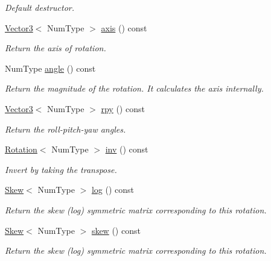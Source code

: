 \begin{DoxyCompactItemize}
\begin{DoxyCompactList}\small\item\em Default destructor. \end{DoxyCompactList}\item 
\hyperlink{singletonscrews_1_1_translation}{Vector3}$<$ Num\+Type $>$ \hyperlink{singletonscrews_1_1_rotation_a7ce8dc80a0e21118bc1c4361677f4a9f}{axis} () const 
\begin{DoxyCompactList}\small\item\em Return the axis of rotation. \end{DoxyCompactList}\item 
Num\+Type \hyperlink{singletonscrews_1_1_rotation_ab13ac401aaf6ff74c9b746e244e88c88}{angle} () const 
\begin{DoxyCompactList}\small\item\em Return the magnitude of the rotation. It calculates the axis internally. \end{DoxyCompactList}\item 
\hyperlink{singletonscrews_1_1_translation}{Vector3}$<$ Num\+Type $>$ \hyperlink{singletonscrews_1_1_rotation_acd934657ce41abab74f4bbafb9781ae5}{rpy} () const 
\begin{DoxyCompactList}\small\item\em Return the roll-\/pitch-\/yaw angles. \end{DoxyCompactList}\item 
\hyperlink{singletonscrews_1_1_rotation}{Rotation}$<$ Num\+Type $>$ \hyperlink{singletonscrews_1_1_rotation_a7cce1a20c1d9f203f5f4f09258866ffc}{inv} () const 
\begin{DoxyCompactList}\small\item\em Invert by taking the transpose. \end{DoxyCompactList}\item 
\hyperlink{singletonscrews_1_1_skew}{Skew}$<$ Num\+Type $>$ \hyperlink{singletonscrews_1_1_rotation_a9bc77fe2db47210ebe86d2ca069204f8}{log} () const 
\begin{DoxyCompactList}\small\item\em Return the skew (log) symmetric matrix corresponding to this rotation. \end{DoxyCompactList}\item 
\hyperlink{singletonscrews_1_1_skew}{Skew}$<$ Num\+Type $>$ \hyperlink{singletonscrews_1_1_rotation_a2e7ada3b71cbcae404560a17e758aa87}{skew} () const 
\begin{DoxyCompactList}\small\item\em Return the skew (log) symmetric matrix corresponding to this rotation. \end{DoxyCompactList}\item 

\end{DoxyCompactItemize}
